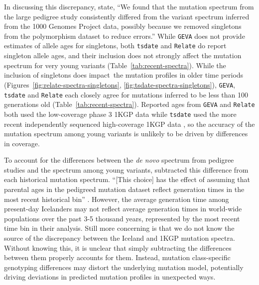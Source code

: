 \documentclass[]{article}
\newcommand{\GEVA}{\texttt{GEVA}\xspace}
\newcommand{\tsdate}{\texttt{tsdate}\xspace}
\newcommand{\relate}{\texttt{Relate}\xspace}
\begin{document}
In discussing this discrepancy, \citet{wang2023human} state, ``We found that
the mutation spectrum from the large pedigree study consistently differed from
the variant spectrum inferred from the 1000 Genomes Project data, possibly
because we removed singletons from the polymorphism dataset to reduce errors.''
While \GEVA does not provide estimates of allele ages for singletons, both
\tsdate and \relate do report singleton allele ages, and their inclusion does
not strongly affect the mutation spectrum for very young variants
(Table~\ref{tab:recent-spectra}). While the inclusion of singletons does
impact\ the mutation profiles in older time periods
(Figures~\ref{fig:relate-spectra-singletons},
\ref{fig:tsdate-spectra-singletons}), \GEVA, \tsdate and \relate each closely
agree for mutations inferred to be less than 100 generations old
(Table~\ref{tab:recent-spectra}). Reported ages from \GEVA and \relate both
used the low-coverage phase 3 1KGP data while \tsdate used the more recent
independently sequenced high-coverage 1KGP data \citep{byrska2022high}, so the
accuracy of the mutation spectrum among young variants is unlikely to be driven
by differences in coverage.

To account for the differences between the \emph{de novo} spectrum from
pedigree studies \citep{jonsson2017parental} and the spectrum among young
variants, \citet{wang2023human} subtracted this difference from each historical
mutation spectrum. ``[This choice] has the effect of assuming that parental ages
in the pedigreed mutation dataset reflect generation times in the most recent
historical bin'' \citep{wang2023human}. However, the average generation time
among present-day Icelanders may not reflect average generation times in
world-wide populations over the past 3-5 thousand years, represented by the
most recent time bin in their analysis. Still more concerning is that we do not
know the source of the discrepancy between the Iceland and 1KGP mutation
spectra. Without knowing this, it is unclear that simply subtracting the
differences between them properly accounts for them. Instead, mutation
class-specific genotyping differences may distort the underlying mutation
model, potentially driving deviations in predicted mutation profiles in
unexpected ways.
\end{document}
